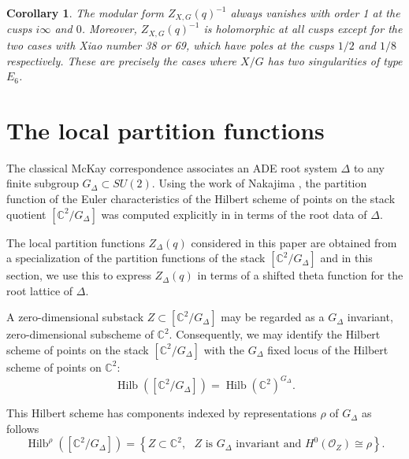\documentclass{article}
\newtheorem{corollary}[theorem]{Corollary}
\theoremstyle{definition}
\newcommand{\CC} {{\mathbb C}}          %
\renewcommand{\O}{\mathcal{O}}
\newcommand{\Hilb}{\operatorname{Hilb}}
\begin{document}
\begin{corollary}\label{cor: vanishing at cusps}
The modular form $Z_{X,G}(q)^{-1}$ always vanishes with order 1 at the cusps
$i\infty$ and $0$. Moreover,
$Z_{X,G}(q)^{-1}$ is holomorphic at all cusps except for the two cases with
Xiao number 38 or 69, which have poles at the cusps $1/2$ and $1/8$
respectively. These are precisely the cases where $X/G$ has two
singularities of type $E_{6}$.
\end{corollary}




\section{The local partition functions}\label{sec: local partition functions}

The classical McKay correspondence associates an ADE root system
$\Delta$ to any finite subgroup $ G_{\Delta}\subset SU(2)$. Using
the work of Nakajima \cite{nakajima2002geometric}, the partition function of the
Euler characteristics of the Hilbert scheme of points on the stack
quotient $[\CC^{2}/G_{\Delta}]$ was computed explicitly in
\cite{gyenge2015euler} in terms of the root data of $\Delta$.

The local partition functions $Z_{\Delta}(q)$ considered in this paper
are obtained from a specialization of the partition functions of the
stack $[\CC^{2} /G_{\Delta}]$ and in this section, we use this to express
$Z_{\Delta}(q)$ in terms of a shifted theta function for the root
lattice of $\Delta$.

A zero-dimensional substack $Z\subset [\CC^{2}/G_{\Delta}]$ may be
regarded as a $G_{\Delta}$ invariant, zero-dimensional subscheme of
$\CC^{2}$. Consequently, we may identify the Hilbert scheme of points
on the stack $[\CC^{2}/G_{\Delta}]$ with the $G_{\Delta}$ fixed locus
of the Hilbert scheme of points on $\CC^{2}$: 
\[
\Hilb \left([\CC^{2}/G_{\Delta}] \right) = \Hilb
(\CC^{2})^{G_{\Delta}} .
\]

This Hilbert scheme has components indexed by representations $\rho$
of $G_{\Delta}$ as follows
\begin{equation*}
\Hilb^{\rho} \left([\CC^{2}/G_{\Delta}] \right) = \left\{ Z\subset
\CC^{2}, \text{ $Z$ is $G_{\Delta}$ invariant and $H^{0}(\O_{Z})\cong
\rho $} \right\}.
\end{equation*}
\end{document}
